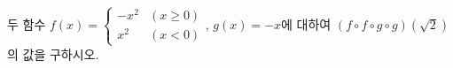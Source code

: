 두 함수 $f(x)=\begin{cases} -x^2 & (x\ge 0) \\ x^2 & (x<0) \end{cases}$, $g(x)=-x$에 대하여 $(f\circ f\circ g\circ g)(\sqrt{2})$의 값을 구하시오.
